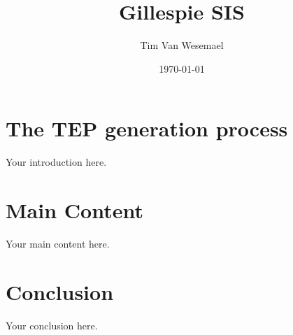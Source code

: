 \documentclass{article}
\title{Gillespie SIS}
\author{Tim Van Wesemael}
\date{\today}
\begin{document}
\maketitle



\section{The TEP generation process}
Your introduction here.

\section{Main Content}
Your main content here.

\section{Conclusion}
Your conclusion here.
\end{document}
